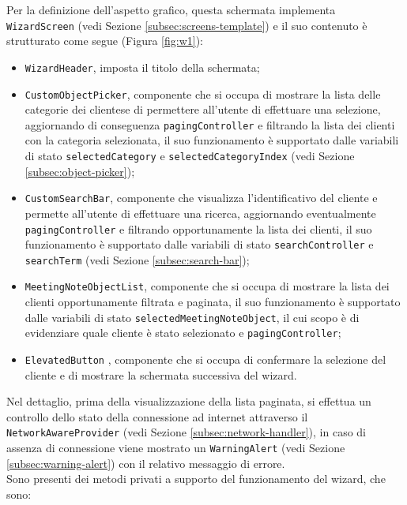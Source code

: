 Per la definizione dell'aspetto grafico, questa schermata implementa \lstinline{WizardScreen} (vedi Sezione \ref{subsec:screens-template}) e il suo contenuto è strutturato come segue (Figura \ref{fig:w1}):
\begin{itemize}
    \item \lstinline{WizardHeader}, imposta il titolo della schermata;
    \item \lstinline{CustomObjectPicker}, componente che si occupa di mostrare la lista delle categorie dei \glspl{cliente}\glsoccur e di permettere all'utente di effettuare una selezione, aggiornando di conseguenza \lstinline{pagingController} e filtrando la lista dei clienti con la categoria selezionata, il suo funzionamento è supportato dalle variabili di stato \lstinline{selectedCategory} e \lstinline{selectedCategoryIndex} (vedi Sezione \ref{subsec:object-picker});
    \item \lstinline{CustomSearchBar}, componente che visualizza l'identificativo del cliente e permette all'utente di effettuare una ricerca, aggiornando eventualmente \lstinline{pagingController} e filtrando opportunamente la lista dei clienti, il suo funzionamento è supportato dalle variabili di stato \lstinline{searchController} e \lstinline{searchTerm} (vedi Sezione \ref{subsec:search-bar});
    \item \lstinline{MeetingNoteObjectList}, componente che si occupa di mostrare la lista dei clienti opportunamente filtrata e paginata, il suo funzionamento è supportato dalle variabili di stato \lstinline{selectedMeetingNoteObject}, il cui scopo è di evidenziare quale cliente è stato selezionato e \lstinline{pagingController};
    \item \lstinline{ElevatedButton} \cite{site:elevated-button}, componente che si occupa di confermare la selezione del cliente e di mostrare la schermata successiva del \gls{wizard}\glsoccur.
\end{itemize}
Nel dettaglio, prima della visualizzazione della lista paginata, si effettua un controllo dello stato della connessione ad internet attraverso il \lstinline{NetworkAwareProvider} (vedi Sezione \ref{subsec:network-handler}), in caso di assenza di connessione viene mostrato un \lstinline{WarningAlert} (vedi Sezione \ref{subsec:warning-alert}) con il relativo messaggio di errore. \\
Sono presenti dei metodi privati a supporto del funzionamento del \gls{wizard}\glsoccur, che sono:
